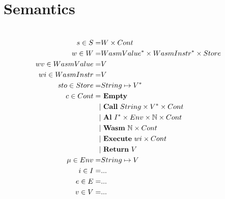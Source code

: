
\chapter{Semantics}
\label{ch:semantics}
\noindent


%
%
%
%
%
%
%
%
%
%




\begin{align*}
%
  \\
  s \in S =& W \times Cont \\
  w \in W =& \seq{WasmValue} \times \seq{WasmInstr} \times Store \\
  wv \in WasmValue =& V \\
  wi \in WasmInstr =& V \\
  sto \in Store =& String \mapsto \seq V \\
  c \in Cont =& ~ \mt \\
    | & ~ \call ~ String \times \seq V \times Cont \\
    | & ~ \al ~ \seq I \times Env \times \mathbb N \times Cont \\
    | & ~ \wasm ~ \mathbb N \times Cont \\
    | & ~ \exe ~ wi \times Cont \\
    | & ~ \ret ~ V \\
  \mu \in Env =& String \mapsto V \\
  i \in I =& ... \\
  e \in E =& ... \\
  v \in V =& ... \\
\end{align*}




